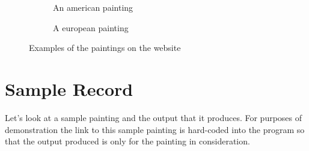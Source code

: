 \documentclass{article}
\begin{document}
\begin{flushleft}
\begin{figure}[H]
\centering
\begin{subfigure}{0.5\textwidth}
\centering
{}
\caption{An american painting}
\end{subfigure}%
\begin{subfigure}{0.5\textwidth}
\centering
{}
\caption{A european painting}
\end{subfigure}
\caption{Examples of the paintings on the website}
\end{figure}
\newpage
\section{Sample Record}
Let's look at a sample painting and the output that it produces. For purposes of demonstration the link to this sample painting is hard-coded into the program so that the output produced is only for the painting in consideration.


\end{flushleft}
\end{document}
